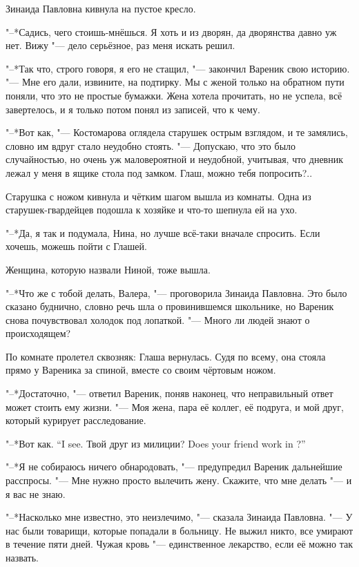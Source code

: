 Зинаида Павловна кивнула на пустое кресло.

"--*Садись, чего стоишь-мнёшься.
Я хоть и из дворян, да дворянства давно уж нет.
Вижу "--- дело серьёзное, раз меня искать решил.

\asterism

"--*Так что, строго говоря, я его не стащил, "--- закончил Вареник свою историю.
"--- Мне его дали, извините, на подтирку.
Мы с женой только на обратном пути поняли, что это не простые бумажки.
Жена хотела прочитать, но не успела, всё завертелось, и я только потом понял из записей, что к чему.

"--*Вот как, "--- Костомарова оглядела старушек острым взглядом, и те замялись, словно им вдруг стало неудобно стоять.
"--- Допускаю, что это было случайностью, но очень уж маловероятной и неудобной, учитывая, что дневник лежал у меня в ящике стола под замком.
Глаш, можно тебя попросить?..

Старушка с ножом кивнула и чётким шагом вышла из комнаты.
Одна из старушек-гвардейцев подошла к хозяйке и что-то шепнула ей на ухо.

"--*Да, я так и подумала, Нина, но лучше всё-таки вначале спросить.
Если хочешь, можешь пойти с Глашей.

Женщина, которую назвали Ниной, тоже вышла.

"--*Что же с тобой делать, Валера, "--- проговорила Зинаида Павловна.
Это было сказано буднично, словно речь шла о провинившемся школьнике, но Вареник снова почувствовал холодок под лопаткой.
"--- Много ли людей знают о происходящем?

По комнате пролетел сквозняк: Глаша вернулась.
Судя по всему, она стояла прямо у Вареника за спиной, вместе со своим чёртовым ножом.

"--*Достаточно, "--- ответил Вареник, поняв наконец, что неправильный ответ может стоить ему жизни.
"--- Моя жена, пара её коллег, её подруга, и мой друг, который курирует расследование.

{"--*Вот как.}
{``I see.}
{Твой друг из милиции?}
{Does your friend work in \militsiya?''}

"--*Я не собираюсь ничего обнародовать, "--- предупредил Вареник дальнейшие расспросы.
"--- Мне нужно просто вылечить жену.
Скажите, что мне делать "--- и я вас не знаю.

"--*Насколько мне известно, это неизлечимо, "--- сказала Зинаида Павловна.
"--- У нас были товарищи, которые попадали в больницу.
Не выжил никто, все умирают в течение пяти дней.
Чужая кровь "--- единственное лекарство, если её можно так назвать.

